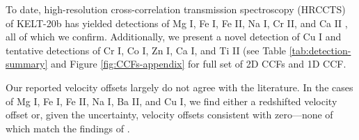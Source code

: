 \documentclass[twocolumn]{aastex631}
\begin{document}
            To date, high-resolution cross-correlation transmission spectroscopy (HRCCTS) of KELT-20b has yielded detections of Mg I, Fe I, Fe II, Na I, Cr II, and Ca II \citep{CasasayasBarris2019, Hoeijmakers2020, Nugroho2020, Rainer2021, Langeveld2022, Sicilia2022}, all of which we confirm. Additionally, we present a novel detection of Cu I and tentative detections of Cr I, Co I, Zn I, Ca I, and Ti II (see Table \ref{tab:detection-summary} and Figure \ref{fig:CCFs-appendix} for full set of 2D CCFs and 1D CCF.

            Our reported velocity offsets largely do not agree with the literature. In the cases of Mg I, Fe I, Fe II, Na I, Ba II, and Cu I, we find either a redshifted velocity offset or, given the uncertainty, velocity offsets consistent with zero—none of which match the findings of \citet{CasasayasBarris2019, Stangret2020, Hoeijmakers2020, Nugroho2020, Rainer2021, Langeveld2022, BelloArufe2022}.
\end{document}
